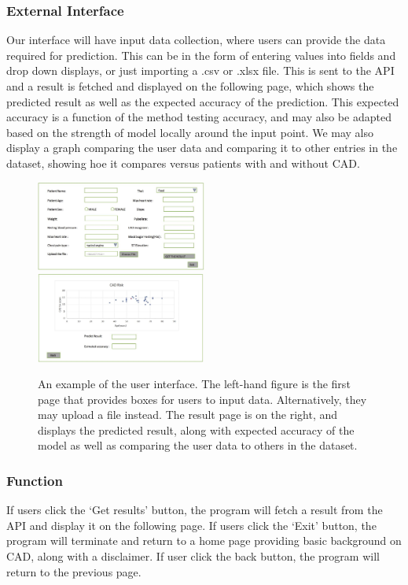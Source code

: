 \documentclass[a4paper, 12pt]{article}
\begin{document}
        \subsubsection{External Interface}
Our interface will have input data collection, where users can provide the data required for prediction. This can be in the form of entering values into fields and drop down displays, or just importing a .csv or .xlsx file. This is sent to the API and a result is fetched and displayed on the following page, which shows the predicted result as well as the expected accuracy of the prediction. This expected accuracy is a function of the method testing accuracy, and may also be adapted based on the strength of model locally around the input point. We may also display a graph comparing the user data and comparing it to other entries in the dataset, showing hoe it compares versus patients with and without CAD.
\begin{figure}[ht]
    \includegraphics[width=0.501\textwidth]{UI1.JPG}
    \includegraphics[width=0.498\textwidth]{UI2.JPG} 
    \caption{An example of the user interface. The left-hand figure is the first page that provides boxes for users to input data. Alternatively, they may upload a file instead. The result page is on the right, and displays the predicted result, along with expected accuracy of the model as well as comparing the user data to others in the dataset.}
    \label{fig:UI}
\end{figure}
        \subsubsection{Function}
If users click the `Get results' button, the program will fetch a result from the API and display it on the following page. If users click the `Exit' button, the program will terminate and return to a home page providing basic background on CAD, along with a disclaimer. If user click the back button, the program will return to the previous page. 
\end{document}
